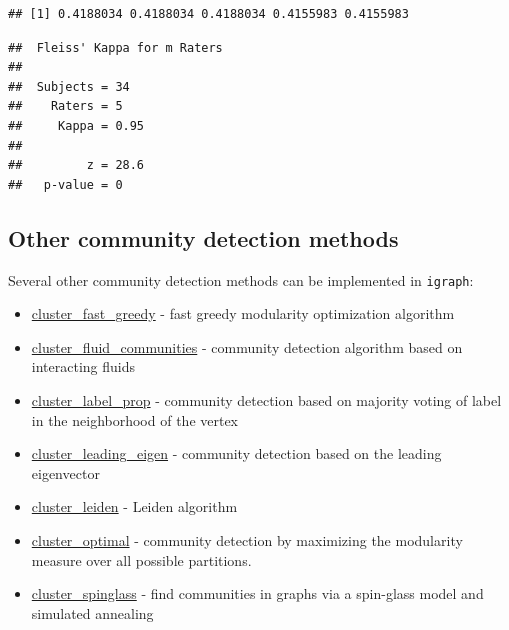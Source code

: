 \documentclass[
]{book}
\newenvironment{Shaded}{\begin{snugshade}}{\end{snugshade}}
\newcommand{\CommentTok}[1]{\textcolor[rgb]{0.56,0.35,0.01}{\textit{#1}}}
\newcommand{\ControlFlowTok}[1]{\textcolor[rgb]{0.13,0.29,0.53}{\textbf{#1}}}
\newcommand{\FunctionTok}[1]{\textcolor[rgb]{0.13,0.29,0.53}{\textbf{#1}}}
\newcommand{\NormalTok}[1]{#1}
\newcommand{\OtherTok}[1]{\textcolor[rgb]{0.56,0.35,0.01}{#1}}
\newcommand{\SpecialCharTok}[1]{\textcolor[rgb]{0.81,0.36,0.00}{\textbf{#1}}}
\providecommand{\tightlist}{%
  \setlength{\itemsep}{0pt}\setlength{\parskip}{0pt}}
\begin{document}
\begin{verbatim}
## [1] 0.4188034 0.4188034 0.4188034 0.4155983 0.4155983
\end{verbatim}

\begin{Shaded}
\end{Shaded}

\begin{verbatim}
##  Fleiss' Kappa for m Raters
## 
##  Subjects = 34 
##    Raters = 5 
##     Kappa = 0.95 
## 
##         z = 28.6 
##   p-value = 0
\end{verbatim}

\subsection{Other community detection methods}\label{other-community-detection-methods}

Several other community detection methods can be implemented in \texttt{igraph}:

\begin{itemize}
\tightlist
\item
  \href{https://igraph.org/r/doc/cluster_fast_greedy.html}{cluster\_fast\_greedy} - fast greedy modularity optimization algorithm
\item
  \href{https://igraph.org/r/doc/cluster_fluid_communities.html}{cluster\_fluid\_communities} - community detection algorithm based on interacting fluids
\item
  \href{https://igraph.org/r/doc/cluster_label_prop.html}{cluster\_label\_prop} - community detection based on majority voting of label in the neighborhood of the vertex
\item
  \href{https://igraph.org/r/doc/cluster_leading_eigen.html}{cluster\_leading\_eigen} - community detection based on the leading eigenvector
\item
  \href{https://igraph.org/r/doc/cluster_leiden.html}{cluster\_leiden} - Leiden algorithm
\item
  \href{https://igraph.org/r/doc/cluster_optimal.html}{cluster\_optimal} - community detection by maximizing the modularity measure over all possible partitions.
\item
  \href{https://igraph.org/r/doc/cluster_spinglass.html}{cluster\_spinglass} - find communities in graphs via a spin-glass model and simulated annealing
\end{itemize}
\end{document}

